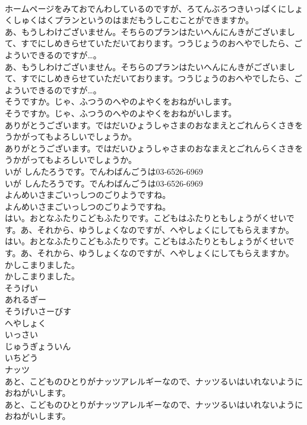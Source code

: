 \documentclass[8pt]{extreport}
\begin{document}
\begin{CJK}{UTF8}{min}
\\	ホームページをみておでんわしているのですが、ろてんぶろつきいっぱくにしょくしゅくはくプランというのはまだもうしこむことができますか。 
\\	あ、もうしわけございません。そちらのプランはたいへんにんきがございまして、すでにしめきらせていただいております。つうじょうのおへやでしたら、ごよういできるのですが…。	
\\	あ、もうしわけございません。そちらのプランはたいへんにんきがございまして、すでにしめきらせていただいております。つうじょうのおへやでしたら、ごよういできるのですが…。 
\\	そうですか。じゃ、ふつうのへやのよやくをおねがいします。	
\\	そうですか。じゃ、ふつうのへやのよやくをおねがいします。 
\\	ありがとうございます。ではだいひょうしゃさまのおなまえとごれんらくさきをうかがってもよろしいでしょうか。	
\\	ありがとうございます。ではだいひょうしゃさまのおなまえとごれんらくさきをうかがってもよろしいでしょうか。 
\\	いが しんたろうです。でんわばんごうは03-6526-6969	
\\	いが しんたろうです。でんわばんごうは03-6526-6969 
\\	よんめいさまごいっしつのごりようですね。	
\\	よんめいさまごいっしつのごりようですね。 
\\	はい。おとなふたりこどもふたりです。こどもはふたりともしょうがくせいです。あ、それから、ゆうしょくなのですが、へやしょくにしてもらえますか。	
\\	はい。おとなふたりこどもふたりです。こどもはふたりともしょうがくせいです。あ、それから、ゆうしょくなのですが、へやしょくにしてもらえますか。 
\\	かしこまりました。	
\\	かしこまりました。 
\\	そうげい
\\	あれるぎー
\\	そうげいさーびす
\\	へやしょく
\\	いっさい
\\	じゅうぎょういん
\\	いちどう
\\	ナッツ
\\	あと、こどものひとりがナッツアレルギーなので、ナッツるいはいれないようにおねがいします。	
\\	あと、こどものひとりがナッツアレルギーなので、ナッツるいはいれないようにおねがいします。 

\end{CJK}
\end{document}

